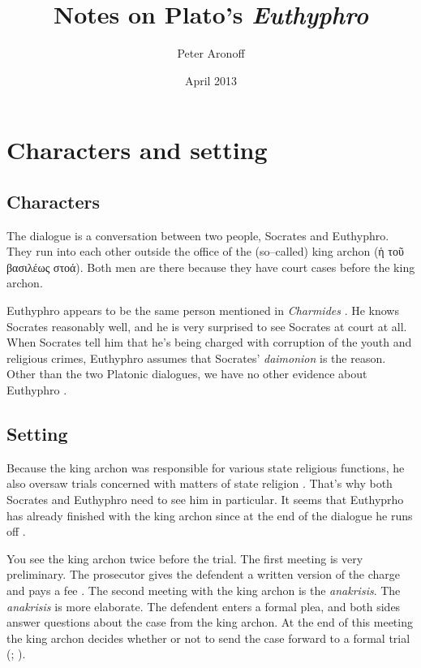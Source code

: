 \documentclass[10pt]{article}
\begin{document}
\title{Notes on Plato's \emph{Euthyphro}}
\author{Peter Aronoff}
\date{April 2013}
\maketitle

\section{Characters and setting}

\subsection{Characters}

The dialogue is a conversation between two people, Socrates and Euthyphro.
They run into each other outside the office of the (so--called) king archon
(ἡ τοῦ βασιλέως στοά).  Both men are there because they have court cases
before the king archon.

Euthyphro appears to be the same person mentioned in \emph{Charmides}
\citep[85]{burnet1924}.  He knows Socrates reasonably well, and he is very
surprised to see Socrates at court at all.  When Socrates tell him that
he's being charged with corruption of the youth and religious crimes,
Euthyphro assumes that Socrates' \emph{daimonion} is the reason.  Other
than the two Platonic dialogues, we have no other evidence about Euthyphro
\cite[16]{bailly2003}.

\subsection{Setting}

Because the king archon was responsible for various state religious
functions, he also oversaw trials concerned with matters of state religion
\citep[82--83]{burnet1924}.  That's why both Socrates and Euthyphro need to
see him in particular.  It seems that Euthyprho has already finished with
the king archon since at the end of the dialogue he runs off
\citep[82]{burnet1924}.

You see the king archon twice before the trial. The first meeting is very
preliminary. The prosecutor gives the defendent a written version of the
charge and pays a fee \citep[7--8]{brickhouse2004}. The second meeting with
the king archon is the \emph{anakrisis}. The \emph{anakrisis} is more
elaborate. The defendent enters a formal plea, and both sides answer
questions about the case from the king archon.  At the end of this meeting
the king archon decides whether or not to send the case forward to a formal
trial (\citealp[82--83]{burnet1924}; \citealp[8]{brickhouse2004}).



\end{document}
